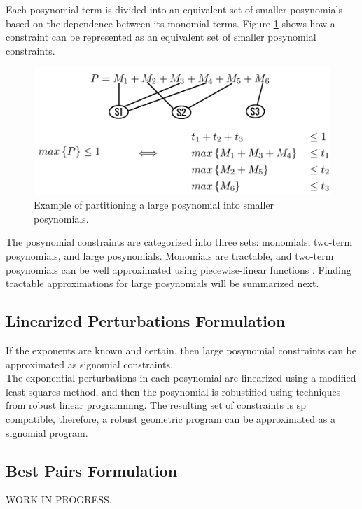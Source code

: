 Each posynomial term is divided into an equivalent set of smaller posynomials based on the dependence between its monomial terms. Figure \ref{partitioning} shows how a constraint can be represented as an equivalent set of smaller posynomial constraints.

\begin{figure}[H]
	\captionsetup{justification=centering, font=small}
	\begin{center}
		\includegraphics[scale=0.25]{partitioning.png}
	\end{center}
	\caption{Example of partitioning a large posynomial into smaller posynomials.}
	\label{partitioning}
\end{figure}

The posynomial constraints are categorized into three sets: monomials, two-term posynomials, and large posynomials. Monomials are tractable, and two-term posynomials can be well approximated using piecewise-linear functions \cite{hsiung_kim_boyd_2007}. Finding tractable approximations for large posynomials will be summarized next.
\subsection{Linearized Perturbations Formulation}
If the exponents are known and certain, then large posynomial constraints can be approximated as signomial constraints. \\
The exponential perturbations in each posynomial are linearized using a modified least squares method, and then the posynomial is robustified using techniques from robust linear programming. The resulting set of constraints is \gls{sp} compatible, therefore, a robust geometric program can be approximated as a signomial program.

\subsection{Best Pairs Formulation}

WORK IN PROGRESS.

